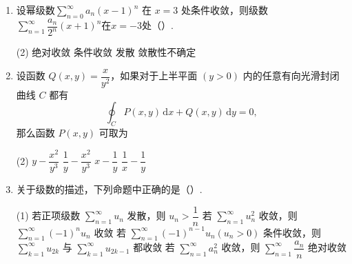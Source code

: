 \documentclass[../Main.tex]{subfiles}
\begin{document}
\begin{enumerate}
\begin{minipage}[t]{0.93\linewidth}
          \begin{tasks}[label=\textbf{\Alph*.}, label-width=1.5em, column-sep=1em](2)
            \task （2）（4）
            \task （1）（3）
            \task （2）（3）
            \task （1）（4）
          \end{tasks}
        \end{minipage}

  \item 设幂级数$ \displaystyle\sum \limits_{n=0}^{\infty} a_n(x-1)^n $ 在 $ x = 3 $ 处条件收敛，则级数 $ \displaystyle\sum \limits_{n=1}^{\infty} \dfrac{a_n}{2^n}(x+1)^n$在$x=-3$处（\qquad）.

        \begin{tasks}[label=\textbf{\Alph*.}, label-width=1.5em, column-sep=1em](2)
          \task 绝对收敛
          \task 条件收敛
          \task 发散
          \task 敛散性不确定
        \end{tasks}

  \item 设函数 $Q(x,y)=\dfrac{x}{y^2}$，如果对于上半平面 $(y>0)$ 内的任意有向光滑封闭曲线 $C$ 都有
        \[
          \oint_C P(x,y)\,\mathrm{d}x + Q(x,y)\,\mathrm{d}y = 0,
        \]
        那么函数 $P(x,y)$ 可取为

        \begin{tasks}[label=\textbf{\Alph*.}, label-width=1.5em, column-sep=1em](2)
          \task $y-\dfrac{x^2}{y^3}$
          \task $\dfrac{1}{y}-\dfrac{x^2}{y^3}$
          \task $x-\dfrac{1}{y}$
          \task $\dfrac{1}{x}-\dfrac{1}{y}$
        \end{tasks}

  \item 关于级数的描述，下列命题中正确的是（\qquad）.

        \begin{tasks}[label=\textbf{\Alph*.}, label-width=1.5em, column-sep=1em](1)
          \task 若正项级数 \( \displaystyle \sum \limits_{n=1}^{\infty} u_n \) 发散，则 $u_n>\dfrac{1}{n}$
          \task 若 \( \displaystyle \sum \limits_{n=1}^{\infty} u_n^2 \) 收敛，则 \( \displaystyle \sum \limits_{n=1}^{\infty} (-1)^n u_n \) 收敛
          \task 若 \( \displaystyle \sum \limits_{n=1}^{\infty} (-1)^{n-1}u_n(u_n>0) \) 条件收敛，则 \( \displaystyle \sum \limits_{k=1}^{\infty} u_{2k} \) 与 \( \displaystyle \sum \limits_{k=1}^{\infty} u_{2k-1} \) 都收敛
          \task 若 \( \displaystyle \sum \limits_{n=1}^{\infty} a_n^2 \) 收敛，则 \( \displaystyle \sum \limits_{n=1}^{\infty} \dfrac{a_n}{n} \) 绝对收敛
        \end{tasks}
\end{enumerate}
\end{document}
